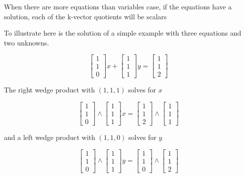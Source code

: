 When there are more equations than variables case, if the equations have a solution, each of the k-vector quotients will be scalars

To illustrate here is the solution of a simple example with three equations and two unknowns.  

\[
\begin{bmatrix}
1 \\ 1 \\ 0
\end{bmatrix}
x
+ 
\begin{bmatrix}
1 \\ 1 \\ 1
\end{bmatrix}
y
= 
\begin{bmatrix}
1 \\ 1 \\ 2
\end{bmatrix}
\]

The right wedge product with $(1, 1, 1)$ solves for $x$

\[
\begin{bmatrix}
1 \\ 1 \\ 0
\end{bmatrix}
\wedge
\begin{bmatrix}
1 \\ 1 \\ 1
\end{bmatrix}
x
= 
\begin{bmatrix}
1 \\ 1 \\ 2
\end{bmatrix}
\wedge
\begin{bmatrix}
1 \\ 1 \\ 1
\end{bmatrix}
\]

and a left wedge product with $(1, 1, 0)$ solves for $y$

\[
\begin{bmatrix}
1 \\ 1 \\ 0
\end{bmatrix}
\wedge
\begin{bmatrix}
1 \\ 1 \\ 1
\end{bmatrix}
y
= 
\begin{bmatrix}
1 \\ 1 \\ 0
\end{bmatrix}
\wedge
\begin{bmatrix}
1 \\ 1 \\ 2
\end{bmatrix}
\]

